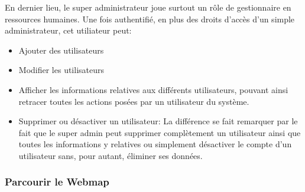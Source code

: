 En dernier lieu, le super administrateur joue surtout un rôle de gestionnaire en ressources 
humaines. Une fois authentifié, en plus des droits d'accès d'un simple administrateur, 
cet utiliateur peut:
\begin{itemize}
    \item Ajouter des utilisateurs
    \item Modifier les utilisateurs
    \item Afficher les informations relatives aux différents utilisateurs, pouvant 
    ainsi retracer toutes les actions posées par un utilisateur du système.
    \item Supprimer ou désactiver un utilisateur: La différence se fait remarquer 
    par le fait que le super admin peut supprimer complètement un utilisateur ainsi 
    que toutes les informations y relatives ou simplement désactiver le compte d'un 
    utilisateur sans, pour autant, éliminer ses données.
\end{itemize}

\subsubsection{Parcourir le Webmap}
